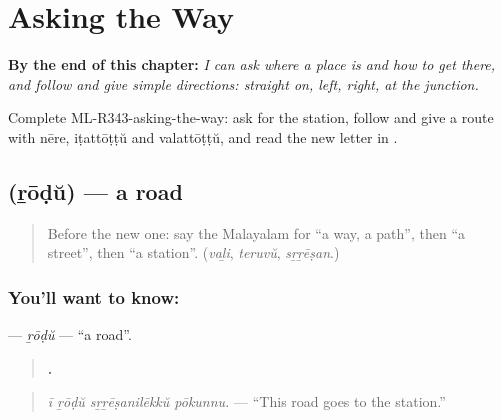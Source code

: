 
\chapter{Asking the Way}
\label{ch:ml-asking-the-way}

\begin{chapteropening}
\textbf{By the end of this chapter:} \emph{I can ask where a place is and how to get there, and follow and give simple directions: straight on, left, right, at the junction.}

Complete ML-R343-asking-the-way: ask for the station, follow and give a route with nēre, iṭattōṭṭŭ and valattōṭṭŭ, and read the new letter  in .
\end{chapteropening}

\section[\texorpdfstring{\ml{റോഡ്} (ṟōḍŭ)}{റോഡ് (ṟōḍŭ)}]{ (ṟōḍŭ) — a road}

\label{lesson:ML-C343-rodu}



\begin{quote}
Before the new one: say the Malayalam for \textquotedblleft{}a way, a path\textquotedblright{}, then \textquotedblleft{}a street\textquotedblright{}, then \textquotedblleft{}a station\textquotedblright{}. (\emph{vaḻi}, \emph{teruvŭ}, \emph{sṟṟēṣan}.)
\end{quote}

\subsection*{You'll want to know: }
\textbf{} — \emph{ṟōḍŭ} — \textquotedblleft{}a road\textquotedblright{}.

\begin{quote}
\textbf{   .}
\end{quote}

\begin{quote}
\emph{ī ṟōḍŭ sṟṟēṣanilēkkŭ pōkunnu.} — \textquotedblleft{}This road goes to the station.\textquotedblright{}
\end{quote}

